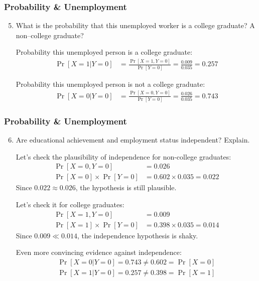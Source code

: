 \begin{frame}
\frametitle{Probability \& Unemployment}
\begin{enumerate}\setcounter{enumi}{4}

\item What is the probability that this unemployed worker is a college graduate? A non–college graduate?

\begin{answer}
Probability this unemployed person is a college graduate:
\begin{align*}
\Pr[X=1|Y=0] 
  & = \frac{\Pr[X=1,Y=0]}{\Pr[Y=0]}
    = \frac{0.009}{0.035}
    = 0.257
\end{align*}

Probability this unemployed person is not a college graduate:
\begin{align*}
\Pr[X=0|Y=0] 
  & = \frac{\Pr[X=0,Y=0]}{\Pr[Y=0]}
    = \frac{0.026}{0.035}
    = 0.743
\end{align*}
\end{answer}

\end{enumerate}
\end{frame}


\begin{frame}
\frametitle{Probability \& Unemployment}
\begin{enumerate}\setcounter{enumi}{5}

\item Are educational achievement and employment status independent? Explain.

\begin{answer}
Let's check the plausibility of independence for non-college graduates:
\begin{align*}
\Pr[X=0,Y=0] 
  & = 0.026 \\
\Pr[X=0] \times \Pr[Y=0] 
  & = 0.602 \times 0.035
    = 0.022
\end{align*}
Since $0.022 \approx 0.026$, the hypothesis is still plausible. 

Let's check it for college graduates:
\begin{align*}
\Pr[X=1,Y=0] 
  & = 0.009 \\
\Pr[X=1] \times \Pr[Y=0] 
  & = 0.398 \times 0.035
    = 0.014
\end{align*}
Since $0.009 \ll 0.014$, the independence hypothesis is shaky.

Even more convincing evidence against independence:
\begin{align*}
\Pr[X=0|Y=0] = 0.743 \ne 0.602 = \Pr[X=0] \\
\Pr[X=1|Y=0] = 0.257 \ne 0.398 = \Pr[X=1] \\
\end{align*}
\end{answer}

\end{enumerate}
\end{frame}

